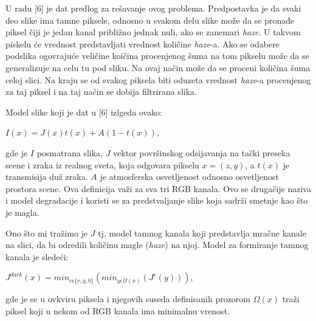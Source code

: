 \documentclass[a4paper,12pt,titlepage]{article}
\begin{document}
U radu [6] je dat predlog za rešavanje ovog problema. Predpostavka je da svaki deo slike ima tamne piksele, odnosno u svakom delu slike može da se pronađe piksel čiji je jedan kanal približno jednak nuli, ako se zanemari \emph{haze}. U takvom piskelu će vrednost predstavljati vrednost količine \emph{haze}-a. Ako se odabere podslika ogovrajuće veličine koičina procenjenog šuma na tom pikselu može da se generalizuje na celu tu pod sliku. Na ovaj način može da se proceni količina šuma celoj slici. Na kraju se od svakog piksela biti oduzeta vrednost \emph{haze}-a procenjenog za taj piksel i na taj način se dobija filtrirana slika.

Model slike koji je dat u [6] izlgeda ovako:

\begin{center}
$I(x) = J(x)t(x) + A(1 - t(x))$,
\end{center}

gde je $I$ posmatrana slika, $J$ vektor površinskog odsijavanja na tački preseka scene i zraka iz realnog sveta, koja odgovara pikselu $x = (z, y)$, a $t(x)$ je transmisija duž zraka. $A$ je atmosferska osvetljenost odnosno osvetljenost prostora scene. Ova definicija važi za sva tri RGB kanala. Ovo se drugačije naziva i model degradacije i koristi se za predstvaljanje slike koja sadrži smetnje kao što je magla.   

Ono što mi tražimo je $J$ tj. model tamnog kanala koji predstavlja mračne kanale na slici, da bi odredili količinu magle (\emph{haze}) na njoj. Model za formiranje tamnog kanala je sledeći:

\begin{center}
$J^{dark}(x) = min_{c \epsilon \{r, g, b \}}( min_{y \epsilon \Omega (x)} (J^c (y)) )$,
\end{center}

gde je se u ovkviru piksela i njegovih suseda definisanih prozorom $\Omega(x)$ traži piksel koji u nekom od RGB kanala ima minimalnu vrenost. 
\end{document}

